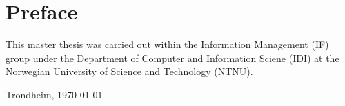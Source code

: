 \section*{Preface}
	\vspace{1cm}
	This master thesis was carried out within the Information Management (IF) 
	group under the Department of Computer and Information Sciene (IDI) 
	at the Norwegian University of Science and Technology (NTNU).
	
	\vfill
	
	\hfill \thesisAuthor
	
	\hfill Trondheim, \today
%	
%	
%	
